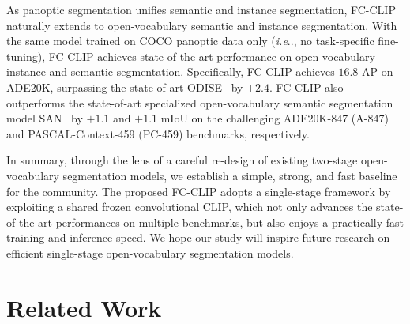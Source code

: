 \documentclass{article}
\makeatletter
\DeclareRobustCommand\onedot{\futurelet\@let@token\@onedot}
\def\@onedot{\ifx\@let@token.\else.\null\fi\xspace}
\def\ie{\emph{i.e}\onedot}
\newcommand{\modelname}{FC-CLIP\xspace}
\makeatother
\begin{document}
As panoptic segmentation unifies semantic and instance segmentation, \modelname naturally extends to open-vocabulary semantic and instance segmentation.
With the same model trained on COCO panoptic data only (\ie, no task-specific fine-tuning), \modelname achieves state-of-the-art performance on open-vocabulary instance and semantic segmentation.
Specifically, \modelname achieves $16.8$ AP on ADE20K, surpassing the state-of-art ODISE~\cite{xu2023open} by $+2.4$.
\modelname also outperforms the state-of-art specialized open-vocabulary semantic segmentation model SAN~\cite{xu2023side} by $+1.1$ and $+1.1$ mIoU on the challenging ADE20K-847 (A-847) and PASCAL-Context-459 (PC-459) benchmarks, respectively.


In summary, through the lens of a careful re-design of existing two-stage open-vocabulary segmentation models, we establish a simple, strong, and fast baseline for the community.
The proposed \modelname adopts a single-stage framework by exploiting a shared frozen convolutional CLIP, which not only advances the state-of-the-art performances on multiple benchmarks, but also enjoys a practically fast training and inference speed.
We hope our study will inspire future research on efficient single-stage open-vocabulary segmentation models. \section{Related Work}
\label{RelatedWork}
\end{document}
